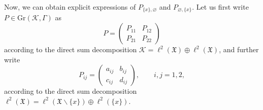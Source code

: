 \documentclass[pdftex]{sigma}
\numberwithin{equation}{section}
\newcommand{\mfrak}[1]{\mathfrak{#1}}
\newcommand{\mcal}[1]{\mathcal{#1}}
\newcommand{\mrm}[1]{\mathrm{#1}}
\begin{document}
Now, we can obtain explicit expressions of $P_{\{x\},\varnothing}$ and $P_{\varnothing,\{x\}}$.
Let us first write $P\in \mrm{Gr}(\mcal{K},\Gamma)$ as
\begin{equation*}
	P=\left(
	\begin{matrix}
	P_{11} & P_{12} \\
	P_{21} & P_{22}
	\end{matrix}
	\right)
\end{equation*}
according to the direct sum decomposition $\mcal{K}=\ell^{2}(\mfrak{X})\oplus \ell^{2}(\mfrak{X})$, and further write
\begin{equation*}
	P_{ij}=\left(
	\begin{matrix}
		a_{ij} & b_{ij} \\
		c_{ij} & d_{ij}
	\end{matrix}
	\right),\qquad i,j=1,2,
\end{equation*}
according to the direct sum decomposition $\ell^{2}(\mfrak{X})=\ell^{2}(\mfrak{X}\backslash\{x\})\oplus \ell^{2}(\{x\})$.
\end{document}
